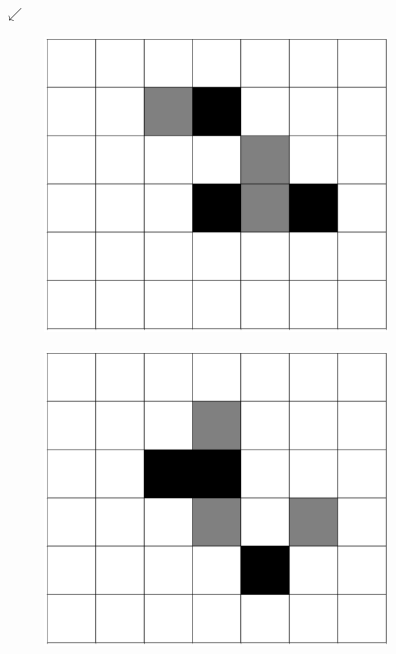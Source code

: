 \documentclass[12pt]{article}
\numberwithin{figure}{section} %
\begin{document}
\begin{figure}[H]
\color{blue}
      {\LARGE$\swarrow{}$}
	\begin{subfigure}{0.18\textwidth}
     		\centering
     		\includegraphics[width=\linewidth]{Section4/30.0}
     		\subcaption{}
   	\end{subfigure}
    	\begin{subfigure}{0.18\textwidth}
     		\centering
     		\includegraphics[width=\linewidth]{Section4/30.1}
     		\subcaption{}

\end{subfigure}
\end{figure}
\end{document}
